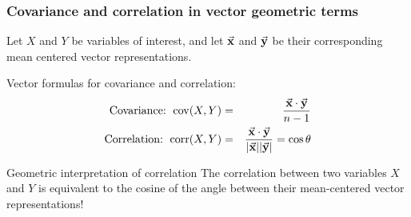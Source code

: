 \documentclass{beamer}
\begin{document}
\begin{frame}
  \frametitle{Covariance and correlation in vector geometric terms}

Let $X$ and $Y$ be variables of interest, and let $\vec{\mathbf{x}}$ and $\vec{\mathbf{y}}$ be their corresponding mean centered vector representations.

\begin{center}

\end{center}

Vector formulas for covariance and correlation:
\begin{eqnarray*}
\text{Covariance: } \operatorname{cov}(X,Y) &=&  \frac{\vec{\mathbf{x}} \cdot \vec{\mathbf{y}}}{n-1}\\
\text{Correlation: } \operatorname{corr}(X,Y) &=&  \frac{\vec{\mathbf{x}} \cdot \vec{\mathbf{y}}}{|\vec{\mathbf{x}}||\vec{\mathbf{y}}|} = \cos \theta
\end{eqnarray*}

\begin{alertblock}{Geometric interpretation of correlation}
    The correlation between two variables $X$ and $Y$ is equivalent to the cosine of the angle between their mean-centered vector representations!
\end{alertblock}
    

\end{frame}
\end{document}

